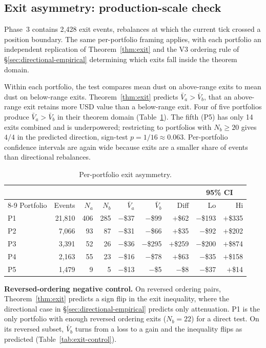 \documentclass[11pt,a4paper]{article}
\theoremstyle{plain}
\begin{document}
\subsection{Exit asymmetry: production-scale check}\label{sec:exit-empirical}

Phase~3 contains 2{,}428 exit events, rebalances at which the current tick crossed a position boundary. The same per-portfolio framing applies, with each portfolio an independent replication of Theorem~\ref{thm:exit} and the V3 ordering rule of \S\ref{sec:directional-empirical} determining which exits fall inside the theorem domain.

Within each portfolio, the test compares mean dust on above-range exits to mean dust on below-range exits. Theorem~\ref{thm:exit} predicts $\bar V_a > \bar V_b$, that an above-range exit retains more USD value than a below-range exit. Four of five portfolios produce $\bar V_a > \bar V_b$ in their theorem domain (Table~\ref{tab:exit-phase3}). The fifth (P5) has only 14 exits combined and is underpowered; restricting to portfolios with $N_b \geq 20$ gives $4/4$ in the predicted direction, sign-test $p = 1/16 \approx 0.063$. Per-portfolio confidence intervals are again wide because exits are a smaller share of events than directional rebalances.

\begin{table}[H]
\centering
\caption{Per-portfolio exit asymmetry.}
\label{tab:exit-phase3}
\begin{tabular}{@{}lrrrrrrrr@{}}
\toprule
 & & & & & & & \multicolumn{2}{c}{95\% CI} \\
\cmidrule(lr){8-9}
Portfolio & Events & $N_a$ & $N_b$ & $\bar V_a$ & $\bar V_b$ & Diff & Lo & Hi \\
\midrule
P1 & 21{,}810 & 406 & 285 & $-$\$37  & $-$\$99  & $+$\$62  & $-$\$193 & $+$\$335 \\
P2 & 7{,}066  & 93  & 87  & $-$\$31  & $-$\$66  & $+$\$35  & $-$\$92  & $+$\$202 \\
P3 & 3{,}391  & 52  & 26  & $-$\$36  & $-$\$295 & $+$\$259 & $-$\$200 & $+$\$874 \\
P4 & 2{,}163  & 55  & 23  & $-$\$16  & $-$\$78  & $+$\$63  & $-$\$35  & $+$\$158 \\
P5 & 1{,}479  & 9   & 5   & $-$\$13  & $-$\$5   & $-$\$8   & $-$\$37  & $+$\$14  \\
\bottomrule
\end{tabular}
\end{table}

\noindent\textbf{Reversed-ordering negative control.} On reversed ordering pairs, Theorem~\ref{thm:exit} predicts a sign flip in the exit inequality, where the directional case in \S\ref{sec:directional-empirical} predicts only attenuation. P1 is the only portfolio with enough reversed ordering exits ($N_b = 22$) for a direct test. On its reversed subset, $\bar V_b$ turns from a loss to a gain and the inequality flips as predicted (Table~\ref{tab:exit-control}).
\end{document}
